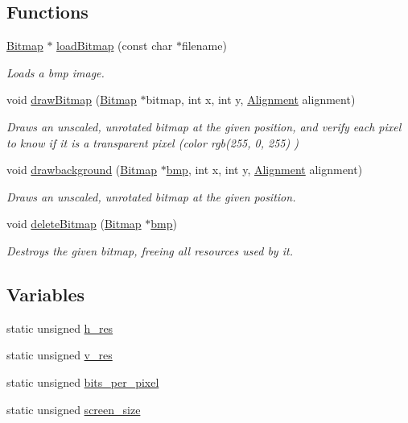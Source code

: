 \subsection*{Functions}
\begin{DoxyCompactItemize}
\item 
\hyperlink{structBitmap}{Bitmap} $\ast$ \hyperlink{group__Bitmap_ga3506880ffd407c36eb8aaddd2c1606d2}{load\+Bitmap} (const char $\ast$filename)
\begin{DoxyCompactList}\small\item\em Loads a bmp image. \end{DoxyCompactList}\item 
void \hyperlink{group__Bitmap_ga18d05a1c671f4638bc63d37874efb9d4}{draw\+Bitmap} (\hyperlink{structBitmap}{Bitmap} $\ast$bitmap, int x, int y, \hyperlink{group__Bitmap_gacdfaca60ec19c0265bac2692d7982726}{Alignment} alignment)
\begin{DoxyCompactList}\small\item\em Draws an unscaled, unrotated bitmap at the given position, and verify each pixel to know if it is a transparent pixel (color rgb(255, 0, 255) ) \end{DoxyCompactList}\item 
void \hyperlink{group__Bitmap_ga362eae5066441f6797d2289c5ccd493d}{drawbackground} (\hyperlink{structBitmap}{Bitmap} $\ast$\hyperlink{menu_8c_a9ac459dc630a69c0162412290c4cc1f6}{bmp}, int x, int y, \hyperlink{group__Bitmap_gacdfaca60ec19c0265bac2692d7982726}{Alignment} alignment)
\begin{DoxyCompactList}\small\item\em Draws an unscaled, unrotated bitmap at the given position. \end{DoxyCompactList}\item 
void \hyperlink{group__Bitmap_ga08c1d4f4fff81df260d979ea8fc1aa61}{delete\+Bitmap} (\hyperlink{structBitmap}{Bitmap} $\ast$\hyperlink{menu_8c_a9ac459dc630a69c0162412290c4cc1f6}{bmp})
\begin{DoxyCompactList}\small\item\em Destroys the given bitmap, freeing all resources used by it. \end{DoxyCompactList}\end{DoxyCompactItemize}
\subsection*{Variables}
\begin{DoxyCompactItemize}
\item 
static unsigned \hyperlink{group__Bitmap_ga43e7e5a0a8f9069e6413b2066ca52f3e}{h\+\_\+res}
\item 
static unsigned \hyperlink{group__Bitmap_ga5bda1b499253a8fbf3cab646f8760391}{v\+\_\+res}
\item 
static unsigned \hyperlink{group__Bitmap_ga89fa3fb58e975d148fcb2413e24b78a1}{bits\+\_\+per\+\_\+pixel}
\item 
static unsigned \hyperlink{group__Bitmap_ga59559f1bdfa71061d06d9ea27c0748ed}{screen\+\_\+size}
\end{DoxyCompactItemize}


